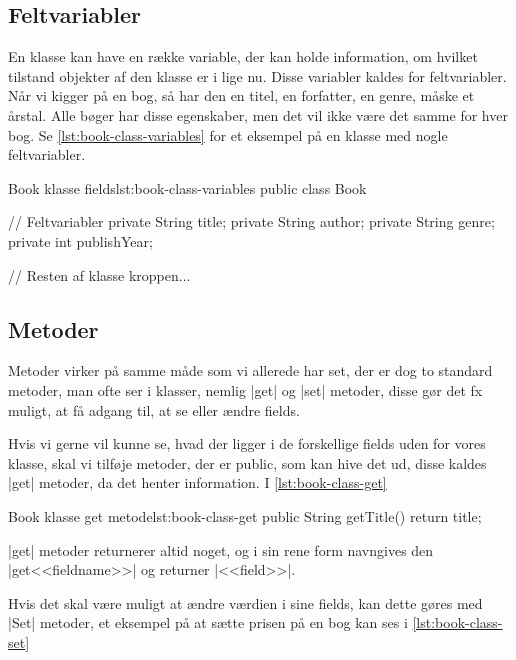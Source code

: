 \subsection{Feltvariabler}

En klasse kan have en række variable, der kan holde information, om
hvilket tilstand objekter af den klasse er i lige nu. Disse variabler
kaldes for feltvariabler. Når vi kigger på en bog, så har den en
titel, en forfatter, en genre, måske et årstal. Alle bøger har disse
egenskaber, men det vil ikke være det samme for hver bog. Se
\autoref{lst:book-class-variables} for et eksempel på en klasse med
nogle feltvariabler.

\begin{JavaCode}{Book klasse fields}{lst:book-class-variables}
	public class Book {

		// Feltvariabler
		private String title;
		private String author;
		private String genre;
		private int publishYear;

		// Resten af klasse kroppen...
	}
\end{JavaCode}


\subsection{Metoder}

Metoder virker på samme måde som vi allerede har set, der er dog to
standard metoder, man ofte ser i klasser, nemlig \JavaInline|get| og
\JavaInline|set| metoder, disse gør det fx muligt, at få adgang til,
at se eller ændre fields.

Hvis vi gerne vil kunne se, hvad der ligger i de forskellige fields
uden for vores klasse, skal vi tilføje metoder, der er public, som kan
hive det ud, disse kaldes \JavaInline|get| metoder, da det henter
information. I \autoref{lst:book-class-get}

\begin{JavaCode}{Book klasse get metode}{lst:book-class-get}
	public String getTitle() {
		return title;
	}
\end{JavaCode}

\JavaInline|get| metoder returnerer altid noget, og i sin rene form
navngives den \JavaInline|get<<fieldname>>| og returner
\JavaInline|<<field>>|.

Hvis det skal være muligt at ændre værdien i sine fields, kan dette
gøres med \JavaInline|Set| metoder, et eksempel på at sætte prisen på
en bog kan ses i \autoref{lst:book-class-set}


